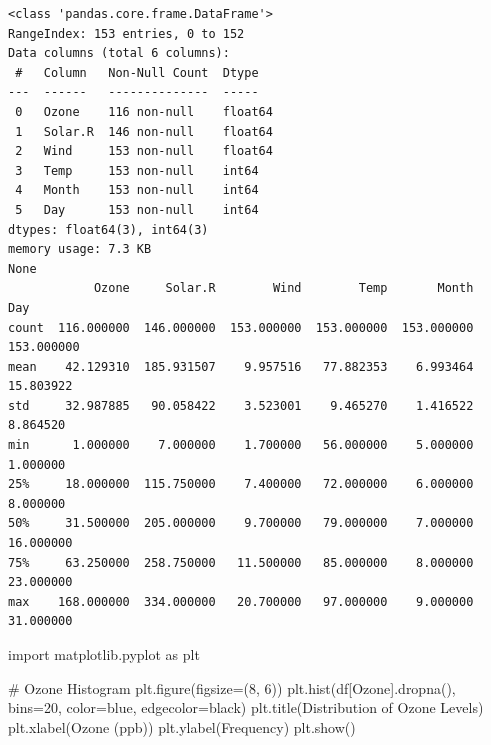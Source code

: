 \documentclass[
  letterpaper,
  DIV=11,
  numbers=noendperiod]{scrreprt}
\newenvironment{Shaded}{\begin{snugshade}}{\end{snugshade}}
\newcommand{\CommentTok}[1]{\textcolor[rgb]{0.37,0.37,0.37}{#1}}
\newcommand{\DecValTok}[1]{\textcolor[rgb]{0.68,0.00,0.00}{#1}}
\newcommand{\ImportTok}[1]{\textcolor[rgb]{0.00,0.46,0.62}{#1}}
\newcommand{\NormalTok}[1]{\textcolor[rgb]{0.00,0.23,0.31}{#1}}
\newcommand{\OperatorTok}[1]{\textcolor[rgb]{0.37,0.37,0.37}{#1}}
\newcommand{\StringTok}[1]{\textcolor[rgb]{0.13,0.47,0.30}{#1}}
\begin{document}
\begin{verbatim}
<class 'pandas.core.frame.DataFrame'>
RangeIndex: 153 entries, 0 to 152
Data columns (total 6 columns):
 #   Column   Non-Null Count  Dtype  
---  ------   --------------  -----  
 0   Ozone    116 non-null    float64
 1   Solar.R  146 non-null    float64
 2   Wind     153 non-null    float64
 3   Temp     153 non-null    int64  
 4   Month    153 non-null    int64  
 5   Day      153 non-null    int64  
dtypes: float64(3), int64(3)
memory usage: 7.3 KB
None
            Ozone     Solar.R        Wind        Temp       Month         Day
count  116.000000  146.000000  153.000000  153.000000  153.000000  153.000000
mean    42.129310  185.931507    9.957516   77.882353    6.993464   15.803922
std     32.987885   90.058422    3.523001    9.465270    1.416522    8.864520
min      1.000000    7.000000    1.700000   56.000000    5.000000    1.000000
25%     18.000000  115.750000    7.400000   72.000000    6.000000    8.000000
50%     31.500000  205.000000    9.700000   79.000000    7.000000   16.000000
75%     63.250000  258.750000   11.500000   85.000000    8.000000   23.000000
max    168.000000  334.000000   20.700000   97.000000    9.000000   31.000000
\end{verbatim}

\begin{Shaded}
\begin{Highlighting}[]
\ImportTok{import}\NormalTok{ matplotlib.pyplot }\ImportTok{as}\NormalTok{ plt}

\CommentTok{\# Ozone Histogram}
\NormalTok{plt.figure(figsize}\OperatorTok{=}\NormalTok{(}\DecValTok{8}\NormalTok{, }\DecValTok{6}\NormalTok{))}
\NormalTok{plt.hist(df[}\StringTok{\textquotesingle{}Ozone\textquotesingle{}}\NormalTok{].dropna(), bins}\OperatorTok{=}\DecValTok{20}\NormalTok{, color}\OperatorTok{=}\StringTok{\textquotesingle{}blue\textquotesingle{}}\NormalTok{, edgecolor}\OperatorTok{=}\StringTok{\textquotesingle{}black\textquotesingle{}}\NormalTok{)}
\NormalTok{plt.title(}\StringTok{\textquotesingle{}Distribution of Ozone Levels\textquotesingle{}}\NormalTok{)}
\NormalTok{plt.xlabel(}\StringTok{\textquotesingle{}Ozone (ppb)\textquotesingle{}}\NormalTok{)}
\NormalTok{plt.ylabel(}\StringTok{\textquotesingle{}Frequency\textquotesingle{}}\NormalTok{)}
\NormalTok{plt.show()}
\end{Highlighting}
\end{Shaded}
\end{document}
